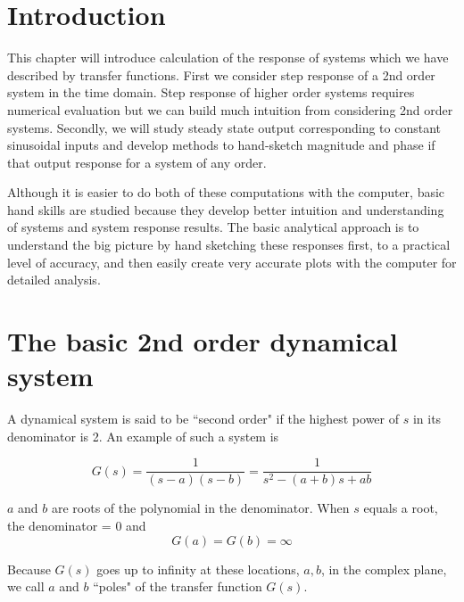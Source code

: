 \section{Introduction}
This chapter will introduce calculation of the response of systems which we have described
by transfer functions.   First we consider step response of a 2nd order system in the time
domain.   Step response of higher order systems requires numerical evaluation but we can
build much intuition from considering 2nd order systems.   Secondly,  we will study steady
state output corresponding to constant sinusoidal inputs and develop methods to
hand-sketch magnitude and phase if that output response for a system of any order.

Although it is easier to do both of these computations with the computer, basic hand skills
are studied because they develop better intuition and understanding of systems and system response
results.  The basic analytical approach is to understand the big picture by hand sketching
these responses first, to a practical level of accuracy, and then easily
create very accurate plots with the computer for detailed analysis.

\section{The basic 2nd order dynamical system}

A dynamical system is said to be ``second order" if the highest power of $s$ in its denominator  is 2.  An example of such a system is

\[
G(s) = \frac1{(s-a)(s-b)} = \frac {1}{s^2 -(a+b)s+ab}
\]


$a$ and $b$ are roots of the polynomial in the denominator.  When $s$ equals a root, the denominator = 0 and
\[
G(a) = G(b) = \infty
\]

Because $G(s)$ goes up to infinity at these locations, $a,b$,  in the complex plane, we call $a$ and $b$ ``poles" of the transfer function
$G(s)$.

\newpage

